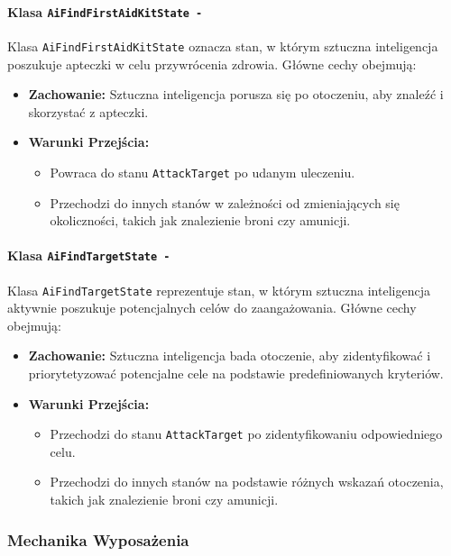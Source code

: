 \paragraph{Klasa \texttt{AiFindFirstAidKitState -}}
Klasa \texttt{AiFindFirstAidKitState} oznacza stan, w którym sztuczna inteligencja poszukuje apteczki w celu przywrócenia zdrowia. Główne cechy obejmują:
\begin{itemize}
  \item \textbf{Zachowanie:} Sztuczna inteligencja porusza się po otoczeniu, aby znaleźć i skorzystać z apteczki.
  \item \textbf{Warunki Przejścia:}
    \begin{itemize}
      \item Powraca do stanu \texttt{AttackTarget} po udanym uleczeniu.
      \item Przechodzi do innych stanów w zależności od zmieniających się okoliczności, takich jak znalezienie broni czy amunicji.
    \end{itemize}
\end{itemize}

\paragraph{Klasa \texttt{AiFindTargetState -}}
Klasa \texttt{AiFindTargetState} reprezentuje stan, w którym sztuczna inteligencja aktywnie poszukuje potencjalnych celów do zaangażowania. Główne cechy obejmują:
\begin{itemize}
  \item \textbf{Zachowanie:} Sztuczna inteligencja bada otoczenie, aby zidentyfikować i priorytetyzować potencjalne cele na podstawie predefiniowanych kryteriów.
  \item \textbf{Warunki Przejścia:}
    \begin{itemize}
      \item Przechodzi do stanu \texttt{AttackTarget} po zidentyfikowaniu odpowiedniego celu.
      \item Przechodzi do innych stanów na podstawie różnych wskazań otoczenia, takich jak znalezienie broni czy amunicji.
    \end{itemize}
\end{itemize}

\subsubsection{Mechanika Wyposażenia}

